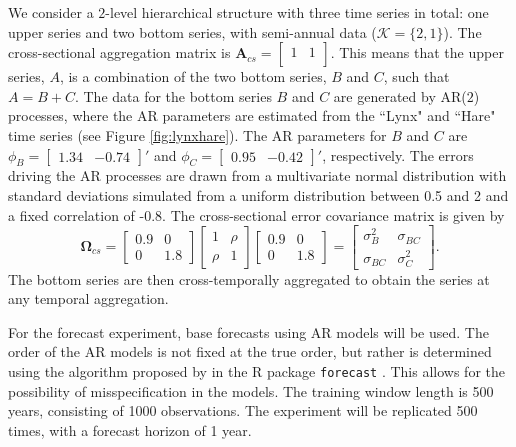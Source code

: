 \documentclass[a4paper,11pt]{article}
\newcommand{\Avet}{\bm{A}}
\newcommand{\Omegavet}{\bm{\Omega}}
\theoremstyle{definition}
\begin{document}
We consider a $2$-level hierarchical structure with three time series in total: one upper series and two bottom series, with semi-annual data ($\mathcal{K} = \{2,1\}$). The cross-sectional aggregation matrix is 
$
\Avet_{cs} = \begin{bmatrix}
1 & 1 \\
\end{bmatrix}
$.
This means that the upper series, $A$, is a combination of the two bottom series, $B$ and $C$, such that $A = B+C$.
The data for the bottom series $B$ and $C$ are generated by AR($2$) processes, where the AR parameters are estimated from the “Lynx" and “Hare" time series (see Figure \ref{fig:lynxhare}). The AR parameters for $B$ and $C$ are 
$
\phi_B = \begin{bmatrix}
1.34 &
-0.74
\end{bmatrix}'$ and $\phi_C = \begin{bmatrix}
0.95 &
-0.42
\end{bmatrix}'
$,
respectively. The errors driving the AR processes are drawn from a multivariate normal distribution with standard deviations simulated from a uniform distribution between 0.5 and 2 and a fixed correlation of -0.8. The cross-sectional error covariance matrix is given by
$$
\Omegavet_{cs} = \begin{bmatrix}
0.9 & 0 \\
0 & 1.8
\end{bmatrix} \begin{bmatrix}
1 & \rho \\
\rho & 1
\end{bmatrix} \begin{bmatrix}
0.9 & 0 \\
0 & 1.8
\end{bmatrix} = \begin{bmatrix}
\sigma_B^2 & \sigma_{BC} \\
\sigma_{BC} & \sigma_C^2
\end{bmatrix}.
$$
The bottom series are then cross-temporally aggregated to obtain the series at any temporal aggregation.

For the forecast experiment, base forecasts using AR models will be used. The order of the AR models is not fixed at the true order, but rather is determined using the algorithm proposed by \cite{hyndman2008a} in the \textsf{R} package \texttt{forecast} \citep{hyndman2022}. This allows for the possibility of misspecification in the models. The training window length is 500 years, consisting of 1000 observations. The experiment will be replicated 500 times, with a forecast horizon of 1 year.
\end{document}
